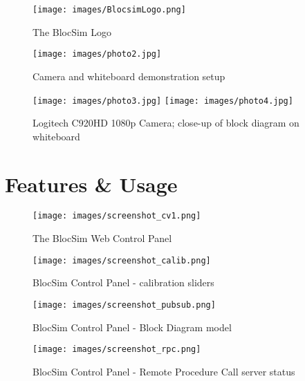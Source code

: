 
\begin{figure}[ht!]
\centering
\texttt{[image: images/BlocsimLogo.png]}
\caption{The BlocSim Logo \cite{blocsim}}
\label{im:blocsimlogo}
\end{figure}

\clearpage



\begin{figure}[ht!]
\centering
\texttt{[image: images/photo2.jpg]}
\caption{Camera and whiteboard demonstration setup}
\label{im:hardware1}
\end{figure}

\begin{figure}[ht!]
\centering
\texttt{[image: images/photo3.jpg]}
\texttt{[image: images/photo4.jpg]}
\caption{Logitech C920HD 1080p Camera; close-up of block diagram on whiteboard}
\label{im:hardware2}
\end{figure}

\clearpage


\section{Features \& Usage}


\begin{figure}[ht!]
\centering
\texttt{[image: images/screenshot\_cv1.png]}
\caption{The BlocSim Web Control Panel \cite{blocsim}}
\label{im:screenshot_cv1}
\end{figure}

\begin{figure}[ht!]
\centering
\texttt{[image: images/screenshot\_calib.png]}
\caption{BlocSim Control Panel - calibration sliders \cite{blocsim}}
\label{im:screenshot_calib}
\end{figure}

\begin{figure}[ht!]
\centering
\texttt{[image: images/screenshot\_pubsub.png]}
\caption{BlocSim Control Panel - Block Diagram model \cite{blocsim}}
\label{im:screenshot_pubsub}
\end{figure}

\begin{figure}[ht!]
\centering
\texttt{[image: images/screenshot\_rpc.png]}
\caption{BlocSim Control Panel - Remote Procedure Call server status \cite{blocsim}}
\label{im:screenshot_rpc}
\end{figure}

